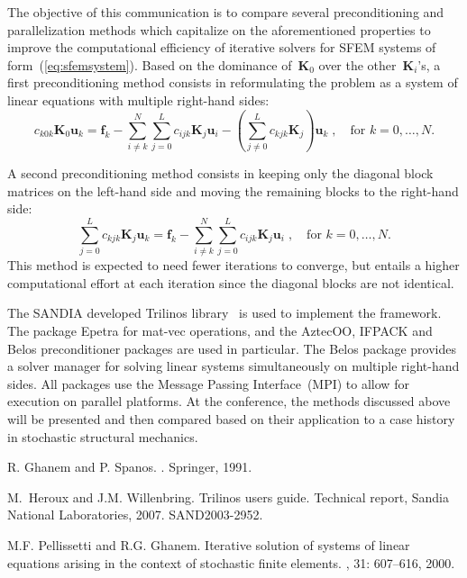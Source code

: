 \documentclass{report}
\begin{document}
The objective of this communication is to compare several preconditioning
and parallelization methods which capitalize on the aforementioned
properties to improve the computational efficiency of iterative solvers
for SFEM systems of form~(\ref{eq:sfemsystem}). Based on the dominance
of~$\boldsymbol{K}_0$ over the other~$\boldsymbol{K}_i$'s, a first
preconditioning method consists in reformulating the problem as a system
of linear equations with multiple right-hand sides:
\begin{equation}
c_{k0k}\boldsymbol{K}_{0}\boldsymbol{u}_{k}=\boldsymbol{f}_{k}-\sum_{i\not=k}^{N}\sum_{j=0}^{L}c_{ijk}\boldsymbol{K}_{j}\boldsymbol{u}_{i}-\left(\sum_{j\not=0}^{L}c_{kjk}\boldsymbol{K}_{j}\right)\boldsymbol{u}_{k}\;,\quad\text{for~$k
= 0,\ldots,N$}.
\end{equation}

A second preconditioning method consists in keeping only the diagonal
block matrices on the left-hand side and moving the remaining blocks to
the right-hand side:
\begin{equation}
\sum_{j=0}^{L}c_{kjk}\boldsymbol{K}_{j}\boldsymbol{u}_{k}=\boldsymbol{f}_{k}-\sum_{i\not=k}^{N}\sum_{j=0}^{L}c_{ijk}\boldsymbol{K}_{j}\boldsymbol{u}_{i}\;,\quad\text{for~$k
= 0,\ldots,N$}.
\end{equation}
This method is expected to need fewer iterations to converge, but entails
a higher computational effort at each iteration since the diagonal blocks
are not identical.

The SANDIA developed Trilinos library~\cite{heroux2007} is used to
implement the framework. The package Epetra for mat-vec operations, and
the AztecOO, IFPACK and Belos preconditioner packages are used in
particular. The Belos package provides a solver manager for solving
linear systems simultaneously on multiple right-hand sides. All packages
use the Message Passing Interface~(MPI) to allow for execution on
parallel platforms. At the conference, the methods discussed above will
be presented and then compared based on their application to a case
history in stochastic structural mechanics.

\begin{thebibliography}{99}
{R}. {G}hanem and {P}. {S}panos.
.
\newblock Springer, 1991.

M.~Heroux and J.M. Willenbring.
\newblock Trilinos users guide.
\newblock Technical report, Sandia National Laboratories, 2007.
\newblock SAND2003-2952.

M.F. Pellissetti and R.G. Ghanem.
\newblock Iterative solution of systems of linear equations arising in the
context of stochastic finite elements.
, 31: 607--616, 2000.
\end{thebibliography}
\end{document}
